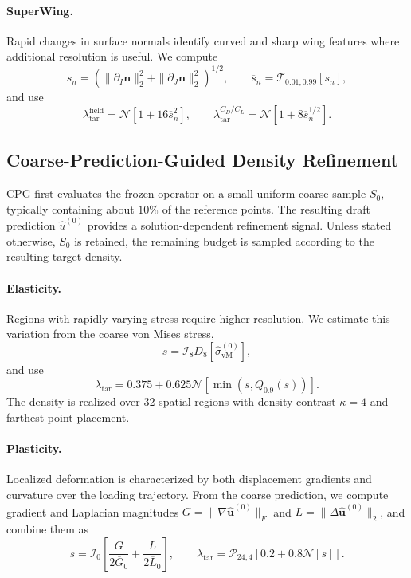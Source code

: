 \paragraph{SuperWing.}
Rapid changes in surface normals identify curved and sharp wing features where
additional resolution is useful. We compute
\[
    s_n
    =
    \left(
        \|\partial_I\mathbf n\|_2^2
        +\|\partial_J\mathbf n\|_2^2
    \right)^{1/2},
    \qquad
    \overline{s}_n
    =\mathcal{T}_{0.01,0.99}[s_n],
\]
and use
\begin{equation}
    \lambda_{\mathrm{tar}}^{\mathrm{field}}
    =\mathcal{N}[1+16\overline{s}_n^2],
    \qquad
    \lambda_{\mathrm{tar}}^{C_D/C_L}
    =\mathcal{N}[1+8\overline{s}_n^{1/2}].
    \label{eq:app_pi_superwing_density}
\end{equation}

\subsection{Coarse-Prediction-Guided Density Refinement}
\label{app:cpg_density_design}

CPG first evaluates the frozen operator on a small uniform coarse sample
$S_0$, typically containing about $10\%$ of the reference points. The resulting
draft prediction $\widehat u^{(0)}$ provides a solution-dependent refinement
signal. Unless stated otherwise, $S_0$ is retained, the remaining budget is
sampled according to the resulting target density.

\paragraph{Elasticity.}
Regions with rapidly varying stress require higher resolution. We estimate this
variation from the coarse von Mises stress,
\[
    s
    =\mathcal{I}_8D_8[
        \widehat{\sigma}_{\mathrm{vM}}^{(0)}
    ],
\]
and use
\begin{equation}
    \lambda_{\mathrm{tar}}
    =0.375
    +0.625\mathcal{N}\!\left[
        \min(s,Q_{0.9}(s))
    \right].
    \label{eq:app_cpg_elasticity_density}
\end{equation}
The density is realized over 32 spatial regions with density contrast
$\kappa=4$ and farthest-point placement.

\paragraph{Plasticity.}
Localized deformation is characterized by both displacement gradients and
curvature over the loading trajectory. From the coarse prediction, we compute
gradient and Laplacian magnitudes
$G=\|\nabla\widehat{\mathbf u}^{(0)}\|_F$ and
$L=\|\Delta\widehat{\mathbf u}^{(0)}\|_2$, and combine them as
\begin{equation}
    s
    =\mathcal{I}_0\!\left[
        \frac{G}{2\overline G_0}
        +\frac{L}{2\overline L_0}
    \right],
    \qquad
    \lambda_{\mathrm{tar}}
    =\mathcal{P}_{24,4}
       [0.2+0.8\mathcal{N}[s]].
    \label{eq:app_cpg_plasticity_density}
\end{equation}

